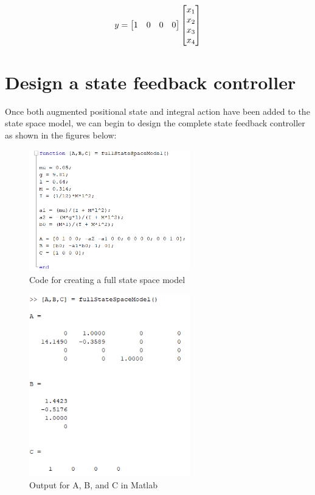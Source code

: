 \documentclass[11pt]{report}
\begin{document}
\begin{equation}
y 
= 
\begin{bmatrix}
1 & 0 & 0 & 0\\
\end{bmatrix}
\begin{bmatrix}
x\textsubscript{1}\\
x\textsubscript{2}\\
x\textsubscript{3}\\
x\textsubscript{4}\\
\end{bmatrix}
\end{equation}

\section{Design a state feedback controller}

Once both augmented positional state and integral action have been added to the state space model, we can begin to design the complete state feedback controller as shown in the figures below: 

\begin{figure}[H]
\centerline{\includegraphics[width=7cm]{fullStateSpaceModel.png}}
\caption{Code for creating a full state space model}
\label{fig}
\end{figure}

\begin{figure}[H]
\centerline{\includegraphics[width=7cm]{fullStateSpaceModeloutput.png}}
\caption{Output for A, B, and C in Matlab}
\label{fig}
\end{figure}
\end{document}
